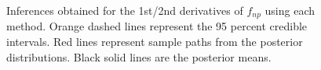 \documentclass{article}
\begin{document}
\begin{figure}[p]
    \centering
     \caption{Inferences obtained for the 1st/2nd derivatives of $f_{np}$ using each method. Orange dashed lines represent the 95 percent credible intervals. Red lines represent sample paths from the posterior distributions. Black solid lines are the posterior means.}
    \label{fig:realdata_2010}
\end{figure}
\end{document}
